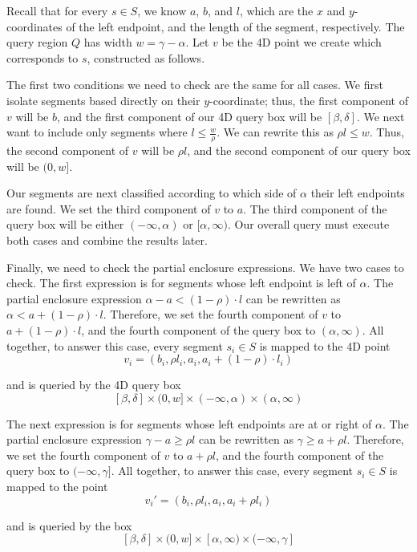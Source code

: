 Recall that for every $s \in S$, we know $a$, $b$, and $l$, which are the $x$ and $y$-coordinates of the left endpoint, and the length of the segment, respectively. 
The query region $Q$ has width $w = \gamma - \alpha$. Let $v$ be the 4D point we create which corresponds to $s$, constructed as follows.

The first two conditions we need to check are the same for all cases. 
We first isolate segments based directly on their $y$-coordinate; thus, the first component of $v$ will be $b$, and the first component of our 4D query box will be $[\beta, \delta]$.
We next want to include only segments where $l \leq \frac{w}{\rho}$. We can rewrite this as $\rho l \leq w$. 
Thus, the second component of $v$ will be $\rho l$, and the second component of our query box will be $(0, w]$.

Our segments are next classified according to which side of $\alpha$ their left endpoints are found.
We set the third component of $v$ to $a$.
The third component of the query box will be either $(-\infty, \alpha)$ or $[\alpha, \infty)$. Our overall query must execute both cases and combine the results later.

Finally, we need to check the partial enclosure expressions.
We have two cases to check. The first expression is for segments whose left endpoint is left of $\alpha$.
The partial enclosure expression $\alpha - a < (1 - \rho) \cdot l$ can be rewritten as $\alpha < a + (1-\rho) \cdot l$.
Therefore, we set the fourth component of $v$ to $a + (1 - \rho) \cdot l$, and the fourth component of the query box to $(\alpha, \infty)$.
All together, to answer this case, every segment $s_i \in S$ is mapped to the 4D point 
\[ 
v_i = (b_i, \rho l_i, a_i, a_i + (1-\rho) \cdot l_i)
\]

\noindent and is queried by the 4D query box
\[
[\beta, \delta] \times (0, w] \times (-\infty, \alpha) \times (\alpha, \infty)
\]

The next expression is for segments whose left endpoints are at or right of $\alpha$. 
The partial enclosure expression $\gamma - a \geq \rho l$ can be rewritten as $\gamma \geq a + \rho l$. 
Therefore, we set the fourth component of $v$ to $a + \rho l$, and the fourth component of the query box to $(-\infty, \gamma]$.  
All together, to answer this case, every segment $s_i \in S$ is mapped to the point
\[
v_i' = (b_i, \rho l_i, a_i, a_i + \rho l_i)
\]

\noindent and is queried by the box
\[
[\beta, \delta] \times (0, w] \times [\alpha, \infty) \times (-\infty, \gamma]
\]

